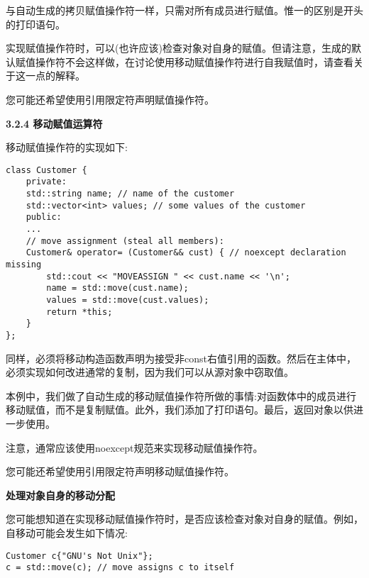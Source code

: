与自动生成的拷贝赋值操作符一样，只需对所有成员进行赋值。惟一的区别是开头的打印语句。\par

实现赋值操作符时，可以(也许应该)检查对象对自身的赋值。但请注意，生成的默认赋值操作符不会这样做，在讨论使用移动赋值操作符进行自我赋值时，请查看关于这一点的解释。\par

您可能还希望使用引用限定符声明赋值操作符。\par

\hspace*{\fill} \par %
\textbf{3.2.4 移动赋值运算符}

移动赋值操作符的实现如下:\par

\begin{lstlisting}[caption={}]
class Customer {
	private:
	std::string name; // name of the customer
	std::vector<int> values; // some values of the customer
	public:
	...
	// move assignment (steal all members):
	Customer& operator= (Customer&& cust) { // noexcept declaration missing
		std::cout << "MOVEASSIGN " << cust.name << '\n';
		name = std::move(cust.name);
		values = std::move(cust.values);
		return *this;
	}
};
\end{lstlisting}

同样，必须将移动构造函数声明为接受非const右值引用的函数。然后在主体中，必须实现如何改进通常的复制，因为我们可以从源对象中窃取值。\par

本例中，我们做了自动生成的移动赋值操作符所做的事情:对函数体中的成员进行移动赋值，而不是复制赋值。此外，我们添加了打印语句。最后，返回对象以供进一步使用。\par

注意，通常应该使用noexcept规范来实现移动赋值操作符。\par

您可能还希望使用引用限定符声明移动赋值操作符。\par

\hspace*{\fill} \par %
\textbf{处理对象自身的移动分配}

您可能想知道在实现移动赋值操作符时，是否应该检查对象对自身的赋值。例如，自移动可能会发生如下情况:\par

\begin{lstlisting}[caption={}]
Customer c{"GNU's Not Unix"};
c = std::move(c); // move assigns c to itself
\end{lstlisting}

